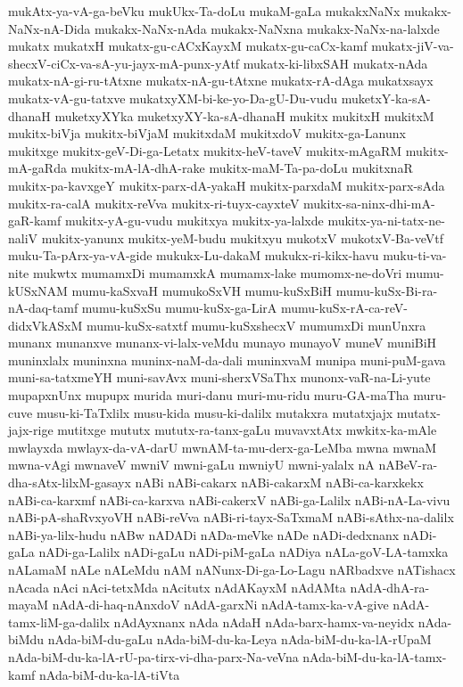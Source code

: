{mukAtx-ya-vA-ga-beVku
mukUkx-Ta-doLu
mukaM-gaLa
mukakxNaNx
mukakx-NaNx-nA-Dida
mukakx-NaNx-nAda
mukakx-NaNxna
mukakx-NaNx-na-lalxde
mukatx
mukatxH
mukatx-gu-cACxKayxM
mukatx-gu-caCx-kamf
mukatx-jiV-va-shecxV-ciCx-va-sA-yu-jayx-mA-punx-yAtf
mukatx-ki-libxSAH
mukatx-nAda
mukatx-nA-gi-ru-tAtxne
mukatx-nA-gu-tAtxne
mukatx-rA-dAga
mukatxsayx
mukatx-vA-gu-tatxve
mukatxyXM-bi-ke-yo-Da-gU-Du-vudu
muketxY-ka-sA-dhanaH
muketxyXYka
muketxyXY-ka-sA-dhanaH
mukitx
mukitxH
mukitxM
mukitx-biVja
mukitx-biVjaM
mukitxdaM
mukitxdoV
mukitx-ga-Lanunx
mukitxge
mukitx-geV-Di-ga-Letatx
mukitx-heV-taveV
mukitx-mAgaRM
mukitx-mA-gaRda
mukitx-mA-lA-dhA-rake
mukitx-maM-Ta-pa-doLu
mukitxnaR
mukitx-pa-kavxgeY
mukitx-parx-dA-yakaH
mukitx-parxdaM
mukitx-parx-sAda
mukitx-ra-calA
mukitx-reVva
mukitx-ri-tuyx-cayxteV
mukitx-sa-ninx-dhi-mA-gaR-kamf
mukitx-yA-gu-vudu
mukitxya
mukitx-ya-lalxde
mukitx-ya-ni-tatx-ne-naliV
mukitx-yanunx
mukitx-yeM-budu
mukitxyu
mukotxV
mukotxV-Ba-veVtf
muku-Ta-pArx-ya-vA-gide
mukukx-Lu-dakaM
mukukx-ri-kikx-havu
muku-ti-va-nite
mukwtx
mumamxDi
mumamxkA
mumamx-lake
mumomx-ne-doVri
mumu-kUSxNAM
mumu-kaSxvaH
mumukoSxVH
mumu-kuSxBiH
mumu-kuSx-Bi-ra-nA-daq-tamf
mumu-kuSxSu
mumu-kuSx-ga-LirA
mumu-kuSx-rA-ca-reV-didxVkASxM
mumu-kuSx-satxtf
mumu-kuSxshecxV
mumumxDi
munUnxra
munanx
munanxve
munanx-vi-lalx-veMdu
munayo
munayoV
muneV
muniBiH
muninxlalx
muninxna
muninx-naM-da-dali
muninxvaM
munipa
muni-puM-gava
muni-sa-tatxmeYH
muni-savAvx
muni-sherxVSaThx
munonx-vaR-na-Li-yute
mupapxnUnx
mupupx
murida
muri-danu
muri-mu-ridu
muru-GA-maTha
muru-cuve
musu-ki-TaTxlilx
musu-kida
musu-ki-dalilx
mutakxra
mutatxjajx
mutatx-jajx-rige
mutitxge
mututx
mututx-ra-tanx-gaLu
muvavxtAtx
mwkitx-ka-mAle
mwlayxda
mwlayx-da-vA-darU
mwnAM-ta-mu-derx-ga-LeMba
mwna
mwnaM
mwna-vAgi
mwnaveV
mwniV
mwni-gaLu
mwniyU
mwni-yalalx
nA
nABeV-ra-dha-sAtx-lilxM-gasayx
nABi
nABi-cakarx
nABi-cakarxM
nABi-ca-karxkekx
nABi-ca-karxmf
nABi-ca-karxva
nABi-cakerxV
nABi-ga-Lalilx
nABi-nA-La-vivu
nABi-pA-shaRvxyoVH
nABi-reVva
nABi-ri-tayx-SaTxmaM
nABi-sAthx-na-dalilx
nABi-ya-lilx-hudu
nABw
nADADi
nADa-meVke
nADe
nADi-dedxnanx
nADi-gaLa
nADi-ga-Lalilx
nADi-gaLu
nADi-piM-gaLa
nADiya
nALa-goV-LA-tamxka
nALamaM
nALe
nALeMdu
nAM
nANunx-Di-ga-Lo-Lagu
nARbadxve
nATishacx
nAcada
nAci
nAci-tetxMda
nAcitutx
nAdAKayxM
nAdAMta
nAdA-dhA-ra-mayaM
nAdA-di-haq-nAnxdoV
nAdA-garxNi
nAdA-tamx-ka-vA-give
nAdA-tamx-liM-ga-dalilx
nAdAyxnanx
nAda
nAdaH
nAda-barx-hamx-va-neyidx
nAda-biMdu
nAda-biM-du-gaLu
nAda-biM-du-ka-Leya
nAda-biM-du-ka-lA-rUpaM
nAda-biM-du-ka-lA-rU-pa-tirx-vi-dha-parx-Na-veVna
nAda-biM-du-ka-lA-tamx-kamf
nAda-biM-du-ka-lA-tiVta
}
